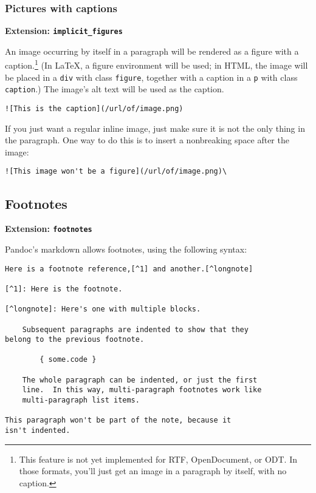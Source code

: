 \documentclass[]{article}
\begin{document}
\subsubsection{Pictures with captions}\label{pictures-with-captions}

\textbf{Extension: \texttt{implicit\_figures}}

An image occurring by itself in a paragraph will be rendered as a figure
with a caption.\footnote{This feature is not yet implemented for RTF,
  OpenDocument, or ODT. In those formats, you'll just get an image in a
  paragraph by itself, with no caption.} (In LaTeX, a figure environment
will be used; in HTML, the image will be placed in a \texttt{div} with
class \texttt{figure}, together with a caption in a \texttt{p} with
class \texttt{caption}.) The image's alt text will be used as the
caption.

\begin{verbatim}
![This is the caption](/url/of/image.png)
\end{verbatim}

If you just want a regular inline image, just make sure it is not the
only thing in the paragraph. One way to do this is to insert a
nonbreaking space after the image:

\begin{verbatim}
![This image won't be a figure](/url/of/image.png)\
\end{verbatim}

\subsection{Footnotes}\label{footnotes}

\textbf{Extension: \texttt{footnotes}}

Pandoc's markdown allows footnotes, using the following syntax:

\begin{verbatim}
Here is a footnote reference,[^1] and another.[^longnote]

[^1]: Here is the footnote.

[^longnote]: Here's one with multiple blocks.

    Subsequent paragraphs are indented to show that they
belong to the previous footnote.

        { some.code }

    The whole paragraph can be indented, or just the first
    line.  In this way, multi-paragraph footnotes work like
    multi-paragraph list items.

This paragraph won't be part of the note, because it
isn't indented.
\end{verbatim}
\end{document}
